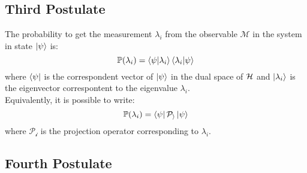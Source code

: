        \subsection{Third Postulate}
        \begin{postulate}
            The probability to get the measurement $\lambda_i$ from the observable 
            $\mathcal{M}$ in the system in state $\ket{\psi}$ is:
            \begin{equation*}
                \mathbb{P}(\lambda_i)=\braket{\psi}{\lambda_i}\braket{\lambda_i}{\psi}
            \end{equation*}
            where $\bra{\psi}$ is the correspondent vector of $\ket{\psi}$ in the 
            dual space of $\mathcal{H}$ and $\ket{\lambda_i}$ is the eigenvector correspontent
            to the eigenvalue $\lambda_i$.\\
            Equivalently, it is possible to write:
            \begin{equation*}
                \mathbb{P}(\lambda_i)=\bra{\psi}\mathcal{P_i}\ket{\psi}
            \end{equation*}
            where $\mathcal{P_i}$ is the projection operator corresponding to $\lambda_i$.
            \label{post:3}
        \end{postulate}

        \subsection{Fourth Postulate}
        \begin{postulate}

            \label{post:4}
        \end{postulate}